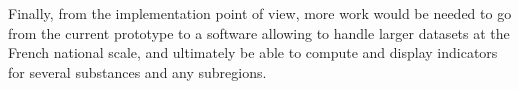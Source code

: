 Finally, from the implementation point of view, more work would be needed to go from the current prototype to a software allowing to handle larger datasets at the French national scale, and ultimately be able to compute and display indicators for several substances and any subregions. 





